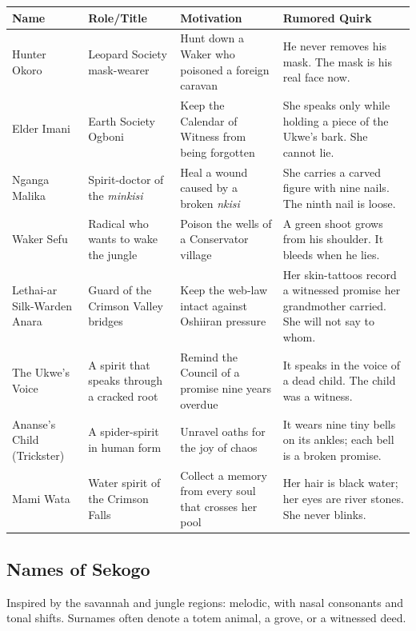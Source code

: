 \begin{longtable}{|p{}|p{}|p{}|p{}|}
\hline
\textbf{Name} & \textbf{Role/Title} & \textbf{Motivation} & \textbf{Rumored Quirk} \\
\hline
Hunter Okoro & Leopard Society mask-wearer & Hunt down a Waker who poisoned a foreign caravan & He never removes his mask. The mask is his real face now. \\
\hline
Elder Imani & Earth Society Ogboni & Keep the Calendar of Witness from being forgotten & She speaks only while holding a piece of the Ukwe's bark. She cannot lie. \\
\hline
Nganga Malika & Spirit-doctor of the \textit{minkisi} & Heal a wound caused by a broken \textit{nkisi} & She carries a carved figure with nine nails. The ninth nail is loose. \\
\hline
Waker Sefu & Radical who wants to wake the jungle & Poison the wells of a Conservator village & A green shoot grows from his shoulder. It bleeds when he lies. \\
\hline
Lethai-ar Silk-Warden Anara & Guard of the Crimson Valley bridges & Keep the web-law intact against Oshiiran pressure & Her skin-tattoos record a witnessed promise her grandmother carried. She will not say to whom. \\
\hline
The Ukwe's Voice & A spirit that speaks through a cracked root & Remind the Council of a promise nine years overdue & It speaks in the voice of a dead child. The child was a witness. \\
\hline
Ananse's Child (Trickster) & A spider-spirit in human form & Unravel oaths for the joy of chaos & It wears nine tiny bells on its ankles; each bell is a broken promise. \\
\hline
Mami Wata & Water spirit of the Crimson Falls & Collect a memory from every soul that crosses her pool & Her hair is black water; her eyes are river stones. She never blinks. \\
\hline
\end{longtable}

\subsection*{Names of Sekogo}
\label{sec:sekogo-names}

Inspired by the savannah and jungle regions: melodic, with nasal consonants and tonal shifts. Surnames often denote a totem animal, a grove, or a witnessed deed.

